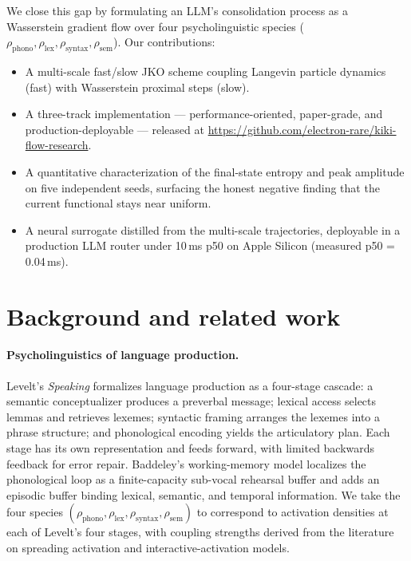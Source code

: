 \documentclass[11pt]{article}
\begin{document}
We close this gap by formulating an LLM's consolidation process as a
Wasserstein gradient flow over four psycholinguistic species
($\rho_{\text{phono}}, \rho_{\text{lex}}, \rho_{\text{syntax}},
\rho_{\text{sem}}$). Our contributions:
\begin{itemize}
  \item A multi-scale fast/slow JKO scheme coupling Langevin particle
        dynamics (fast) with Wasserstein proximal steps (slow).
  \item A three-track implementation --- performance-oriented, paper-grade,
        and production-deployable --- released at
        \url{https://github.com/electron-rare/kiki-flow-research}.
  \item A quantitative characterization of the final-state entropy and
        peak amplitude on five independent seeds, surfacing the honest
        negative finding that the current functional stays near uniform.
  \item A neural surrogate distilled from the multi-scale trajectories,
        deployable in a production LLM router under 10\,ms p50 on
        Apple Silicon (measured p50 = 0.04\,ms).
\end{itemize}

\section{Background and related work}
\label{sec:related}

\paragraph{Psycholinguistics of language production.}
Levelt's \emph{Speaking} \cite{levelt1989speaking} formalizes language
production as a four-stage cascade: a semantic conceptualizer produces a
preverbal message; lexical access selects lemmas and retrieves lexemes;
syntactic framing arranges the lexemes into a phrase structure; and
phonological encoding yields the articulatory plan. Each stage has its
own representation and feeds forward, with limited backwards feedback
for error repair. Baddeley's working-memory model
\cite{baddeley2000episodic} localizes the phonological loop as a
finite-capacity sub-vocal rehearsal buffer and adds an episodic buffer
binding lexical, semantic, and temporal information. We take the four
species $(\rho_{\text{phono}}, \rho_{\text{lex}}, \rho_{\text{syntax}},
\rho_{\text{sem}})$ to correspond to activation densities at each of
Levelt's four stages, with coupling strengths derived from the literature
on spreading activation and interactive-activation models.
\end{document}
